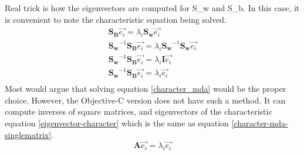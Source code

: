 Real trick is how the eigenvectors are computed for S_w and S_b. In this case, it is convenient to note the characteristic equation being solved.
\begin{eqnarray}
\mathbf{S_B}\vec{e_i} = \lambda_i \mathbf{S_w}\vec{e_i} \label{character_mda}\\
\mathbf{S_w}^{-1}\mathbf{S_B}\vec{e_i} = \lambda_i \mathbf{S_w}^{-1} \mathbf{S_w}\vec{e_i} \\
\mathbf{S_w}^{-1}\mathbf{S_B}\vec{e_i} = \lambda_i \mathbf{I} \vec{e_i} \\
\mathbf{S_w}^{-1}\mathbf{S_B}\vec{e_i} = \lambda_i \vec{e_i} \label{character-mda-singlematrix}\\
\end{eqnarray}
Most would argue that solving equation \ref{character_mda} would be the proper choice.  However, the Objective-C version does not have such a method.  It can compute inverses of square matrices, and eigenvectors of the characteristic equation \ref{eigenvector-character} which is the same as equation \ref{character-mda-singlematrix}.
\begin{equation}
\mathbf{A} \vec{e_i} = \lambda_i \vec{e_i} \label{eigenvector-character}
\end{equation}

 